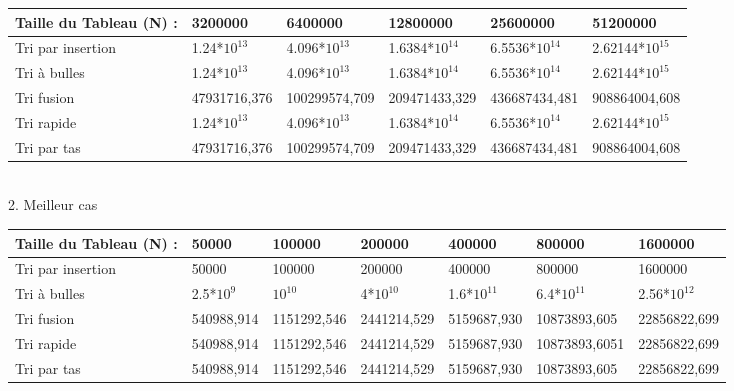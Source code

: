 \documentclass[12pt]{article}
\begin{document}
\begin{tabular}{|p{3cm}||p{2.5cm}|p{2.5cm}|p{2.5cm}|p{2.5cm}|p{2.5cm}|}
\hline
Taille du Tableau (N) : & 3200000 & 6400000 & 12800000 & 25600000 &  51200000  \\
\hline
Tri par insertion  & 1.24*$10^{13}$ & 4.096*$10^{13}$ & 1.6384*$10^{14}$ & 6.5536*$10^{14}$ & 2.62144*$10^{15}$    \\
\hline
Tri à bulles  & 1.24*$10^{13}$ & 4.096*$10^{13}$ & 1.6384*$10^{14}$ & 6.5536*$10^{14}$ & 2.62144*$10^{15}$    \\
\hline
Tri fusion  & 47931716,376 & 100299574,709 & 209471433,329 & 436687434,481 & 908864004,608 \\
\hline
Tri rapide  & 1.24*$10^{13}$ & 4.096*$10^{13}$ & 1.6384*$10^{14}$ & 6.5536*$10^{14}$ & 2.62144*$10^{15}$    \\
\hline
Tri par tas & 47931716,376 & 100299574,709 & 209471433,329 & 436687434,481 & 908864004,608 \\
\hline
\end{tabular}\\




2. Meilleur cas\\

\begin{tabular}{|p{3cm}||p{2cm}|p{2cm}|p{2cm}|p{2cm}|p{2.05cm}|p{2cm}|}
\hline
Taille du Tableau (N) : & 50000 & 100000 & 200000 & 400000 & 800000  & 1600000\\
\hline
Tri par insertion  & 50000 & 100000 & 200000 & 400000 & 800000  & 1600000\\
\hline
Tri à bulles  & 2.5*$10^{9}$ & $10^{10}$ & 4*$10^{10}$ & 1.6*$10^{11}$ & 6.4*$10^{11}$ & 2.56*$10^{12}$  \\
\hline
Tri fusion & 540988,914 & 1151292,546 & 2441214,529 & 5159687,930 & 10873893,605 &  22856822,699\\
\hline
Tri rapide & 540988,914 & 1151292,546 & 2441214,529 & 5159687,930 & 10873893,6051 &  22856822,699\\
\hline
Tri par tas & 540988,914 & 1151292,546 & 2441214,529 & 5159687,930 & 10873893,605 &  22856822,699\\
\hline
\end{tabular}
\end{document}
